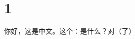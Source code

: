 \documentclass{CCNUthesis}
\begin{document}
  \tableofcontents
  \section{1}
  你好，这是中文。这个：是什么？对（了）
\end{document}
